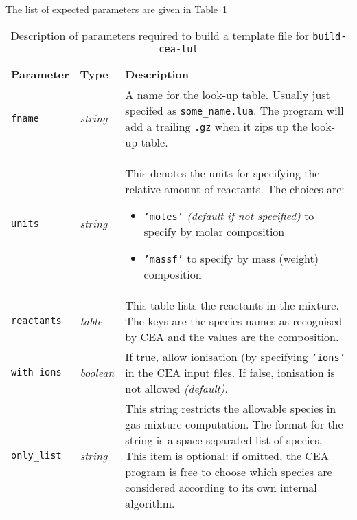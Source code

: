 \noindent
The list of expected parameters are given in Table~\ref{tab:lut-template}
\begin{table}[ht]
\begin{center}
\caption{Description of parameters required to build a template file for \texttt{build-cea-lut}}
\label{tab:lut-template}
\begin{tabular}{llp{8cm}}
\hline \hline
Parameter & Type & Description \\ \hline
\texttt{fname} & \textit{string} & A name for the look-up table.  Usually just specifed as
                                   \texttt{some\_name.lua}.  The program will add a trailing
                                   \texttt{.gz} when it zips up the look-up table. \\
\texttt{units} & \textit{string} & This denotes the units for specifying the relative amount of reactants.
                                   The choices are:
                                   \begin{itemize}
                                      \item \texttt{'moles'} \textit{(default if not specified)} to specify by molar composition
                                      \item \texttt{'massf'} to specify by mass (weight) composition 
                                   \end{itemize} \\
\texttt{reactants} & \textit{table} & This table lists the reactants in the mixture.  The keys are the species names as
                                      recognised by CEA and the values are the composition. \\
\texttt{with\_ions} & \textit{boolean} & If true, allow ionisation (by specifying \texttt{'ions'} in the CEA input files.
                                         If false, ionisation is not allowed \textit{(default)}. \\
\texttt{only\_list} & \textit{string} & This string restricts the allowable species in gas mixture computation.  The format for
                                        the string is a space separated list of species.  This item is optional: if omitted, 
                                        the CEA program is free to choose which species are considered according to its
                                        own internal algorithm. \\
\hline
\end{tabular}
\end{center}
\end{table}

